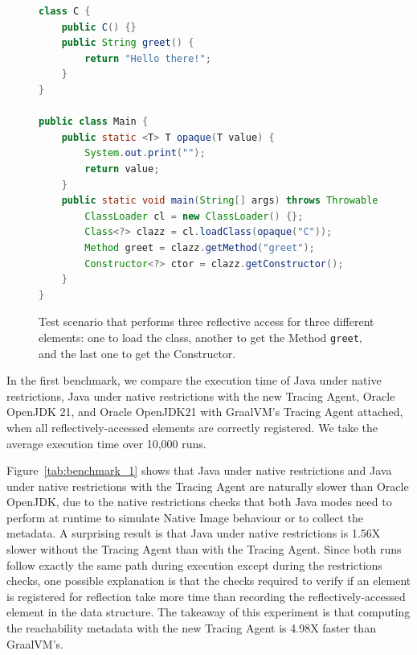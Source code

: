 \begin{figure}[ht]
    \centering
\begin{lstlisting}[language=Java]
class C {
    public C() {}
    public String greet() {
        return "Hello there!";
    }
}

public class Main {
    public static <T> T opaque(T value) {
        System.out.print("");
        return value;
    }
    public static void main(String[] args) throws Throwable {
        ClassLoader cl = new ClassLoader() {};
        Class<?> clazz = cl.loadClass(opaque("C"));
        Method greet = clazz.getMethod("greet");
        Constructor<?> ctor = clazz.getConstructor();
    }
}
\end{lstlisting}
    \caption{Test scenario that performs three reflective access for three different elements: one to load the class, another to get the Method \texttt{greet}, and the last one to get the Constructor.}
    \label{fig:benchmark}
\end{figure}

In the first benchmark, we compare the execution time of Java under native restrictions, Java under native restrictions with the new Tracing Agent, Oracle OpenJDK 21, and Oracle OpenJDK21 with GraalVM's Tracing Agent attached, when all reflectively-accessed elements are correctly registered. We take the average execution time over 10,000 runs.

Figure~\ref{tab:benchmark_1} shows that Java under native restrictions and Java under native restrictions with the Tracing Agent are naturally slower than Oracle OpenJDK, due to the native restrictions checks that both Java modes need to perform at runtime to simulate Native Image behaviour or to collect the metadata. 
A surprising result is that Java under native restrictions is 1.56X slower without the Tracing Agent than with the Tracing Agent. Since both runs follow exactly the same path during execution except during the restrictions checks, one possible explanation is that the checks required to verify if an element is registered for reflection take more time than recording the reflectively-accessed element in the data structure. The takeaway of this experiment is that computing the reachability metadata with the new Tracing Agent is 4.98X faster than GraalVM's.

